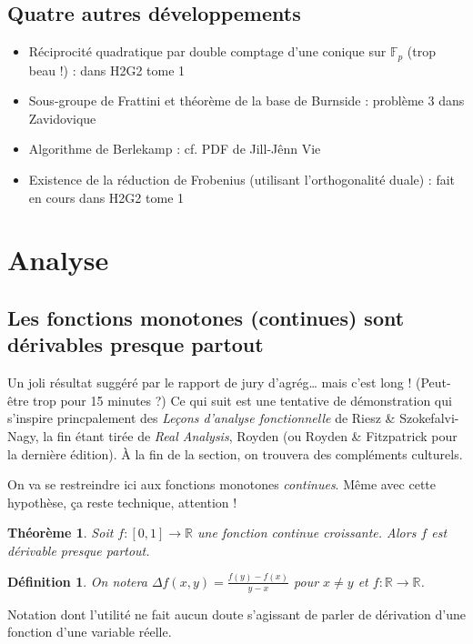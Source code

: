 \documentclass[a4paper, 11pt]{article}
\def\F{\mathbb{F}}
\def\R{\mathbb{R}}
\newtheorem*{definition}{Définition}
\newtheorem*{theorem}{Théorème}
\begin{document}
\subsection{Quatre autres développements}

\begin{itemize}
\item Réciprocité quadratique par double comptage d'une conique sur $\F_p$ (trop
  beau !) : dans H2G2 tome 1
\item Sous-groupe de Frattini et théorème de la base de Burnside : problème 3
  dans Zavidovique
\item Algorithme de Berlekamp : cf. PDF de Jill-Jênn Vie
\item Existence de la réduction de Frobenius (utilisant l'orthogonalité duale) :
  fait en cours dans H2G2 tome 1
\end{itemize}


\newpage

\section{Analyse}

\subsection{Les fonctions monotones (continues) sont dérivables presque partout}

Un joli résultat suggéré par le rapport de jury d'agrég… mais c'est long !
(Peut-être trop pour 15 minutes ?) Ce qui suit est une tentative de
démonstration qui s'inspire princpalement des \emph{Leçons d'analyse
  fonctionnelle} de Riesz \& Szokefalvi-Nagy, la fin étant tirée de \emph{Real
  Analysis}, Royden (ou Royden \& Fitzpatrick pour la dernière édition). À la
fin de la section, on trouvera des compléments culturels.

On va se restreindre ici aux fonctions monotones \emph{continues}. Même avec
cette hypothèse, ça reste technique, attention !
\begin{theorem}
  Soit $f : [0,1] \to \R$ une fonction continue croissante. Alors $f$ est
  dérivable presque partout.
\end{theorem}

\begin{definition}
  On notera $\displaystyle \Delta f(x,y) = \frac{f(y) - f(x)}{y - x}$ pour $x
  \neq y$ et $f : \R \to \R$.
\end{definition}
Notation dont l'utilité ne fait aucun doute s'agissant de parler de dérivation
d'une fonction d'une variable réelle.
\end{document}
